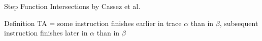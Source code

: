\documentclass{beamer}
\begin{document}
\begin{frame}{Step Function Intersections by Cassez et al.}
    \begin{block}{Definition}
        TA = some instruction finishes earlier in trace $\alpha$ than in $\beta$, subsequent instruction finishes later in $\alpha$ than in $\beta$
    \end{block}

    
\end{frame}
\end{document}
